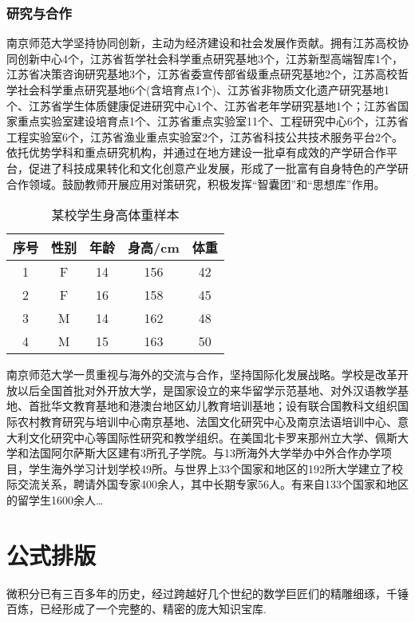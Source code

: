 \documentclass[UTF8,a4paper,twoside,zihao=-4]{ctexrep}
\theoremstyle{nonumberplain}
\begin{document}
\subsection{研究与合作}
南京师范大学坚持协同创新，主动为经济建设和社会发展作贡献。拥有江苏高校协同创新中心4个，江苏省哲学社会科学重点研究基地3个，江苏新型高端智库1个，江苏省决策咨询研究基地3个，江苏省委宣传部省级重点研究基地2个，江苏高校哲学社会科学重点研究基地6个(含培育点1个)、江苏省非物质文化遗产研究基地1个、江苏省学生体质健康促进研究中心1个、江苏省老年学研究基地1个；江苏省国家重点实验室建设培育点1个、江苏省重点实验室11个、工程研究中心6个，江苏省工程实验室6个，江苏省渔业重点实验室2个，江苏省科技公共技术服务平台2个。依托优势学科和重点研究机构，并通过在地方建设一批卓有成效的产学研合作平台，促进了科技成果转化和文化创意产业发展，形成了一批富有自身特色的产学研合作领域。鼓励教师开展应用对策研究，积极发挥“智囊团”和“思想库”作用。
\begin{table}[htb]\caption{某校学生身高体重样本}\label{tb:hw}
\centering{}
\begin{tabular}{ccccc}
	\toprule
	序号 & 性别 & 年龄 & 身高/cm & 体重 \\
	\midrule
	1 & F & 14 & 156 &42 \\
	2 & F & 16 & 158 & 45 \\
	3 & M & 14 & 162 & 48 \\
	4 & M & 15 & 163 & 50 \\
	\bottomrule 
\end{tabular}
\end{table}

南京师范大学一贯重视与海外的交流与合作，坚持国际化发展战略。学校是改革开放以后全国首批对外开放大学，是国家设立的来华留学示范基地、对外汉语教学基地、首批华文教育基地和港澳台地区幼儿教育培训基地；设有联合国教科文组织国际农村教育研究与培训中心南京基地、法国文化研究中心及南京法语培训中心、意大利文化研究中心等国际性研究和教学组织。在美国北卡罗来那州立大学、佩斯大学和法国阿尔萨斯大区建有3所孔子学院。与13所海外大学举办中外合作办学项目，学生海外学习计划学校49所。与世界上33个国家和地区的192所大学建立了校际交流关系，聘请外国专家400余人，其中长期专家56人。有来自133个国家和地区的留学生1600余人\dots

\chapter{公式排版}
微积分已有三百多年的历史，经过跨越好几个世纪的数学巨匠们的精雕细琢，千锤百炼，已经形成了一个完整的、精密的庞大知识宝库\citep{CS2016}.
\end{document}
